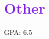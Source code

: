 \documentclass[letterpaper,11pt]{article}
\makeatletter
\newcommand{\resumeItem}[1]{
  \item\small{
    {#1 \vspace{-2pt}}
  }
}
\newcommand{\resumeSubheading}[4]{
  \vspace{-2pt}\item
    \begin{tabular*}{1.0\textwidth}[t]{l@{\extracolsep{\fill}}r}
      \textbf{#1} & \textbf{\small #2} \\
      \textit{\small#3} & \textit{\small #4} \\
    \end{tabular*}\vspace{-7pt}
}
\newcommand{\resumeSubHeadingListStart}{\begin{itemize}[leftmargin=0.0in, label={}]}
\newcommand{\resumeSubHeadingListEnd}{\end{itemize}}
\newcommand{\resumeItemListStart}{\begin{itemize}}
\newcommand{\resumeItemListEnd}{\end{itemize}\vspace{-5pt}}
\makeatother
\begin{document}
\section{\textcolor{BlueViolet}{Other}}
 \begin{itemize}[leftmargin=0.15in]
    {\item{
        { GPA: 6.5} \\
    }}
 \end{itemize}
 \vspace{-16pt}

        


\end{document}
